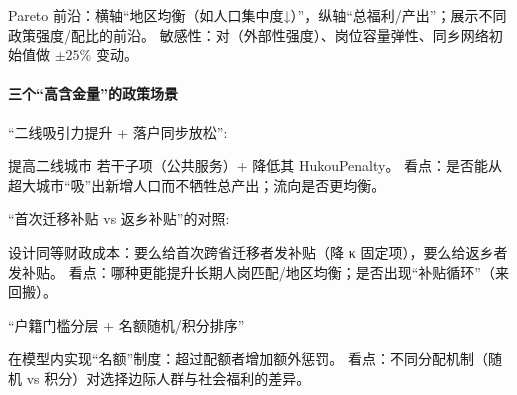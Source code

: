 \documentclass[
  a4paper,
  zihao=-4,
  fontset=mac,
  AutoFakeBold,
  AutoFakeSlant,
  oneside]{ctexbook}
\begin{document}
Pareto 前沿：横轴“地区均衡（如人口集中度↓）”，纵轴“总福利/产出”；展示不同政策强度/配比的前沿。
敏感性：对（外部性强度）、岗位容量弹性、同乡网络初始值做 $\pm 25\%$ 变动。

\paragraph{三个“高含金量”的政策场景}

“二线吸引力提升 + 落户同步放松”:

提高二线城市  若干子项（公共服务）+ 降低其 HukouPenalty。
看点：是否能从超大城市“吸”出新增人口而不牺牲总产出；流向是否更均衡。

“首次迁移补贴 vs 返乡补贴”的对照:

设计同等财政成本：要么给首次跨省迁移者发补贴（降 
κ 固定项），要么给返乡者发补贴。
看点：哪种更能提升长期人岗匹配/地区均衡；是否出现“补贴循环”（来回搬）。

“户籍门槛分层 + 名额随机/积分排序”

在模型内实现“名额”制度：超过配额者增加额外惩罚。
看点：不同分配机制（随机 vs 积分）对选择边际人群与社会福利的差异。








\end{document}
